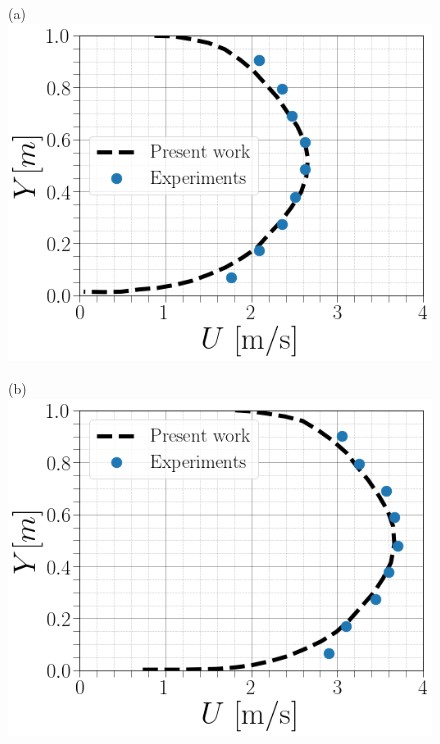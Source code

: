 \documentclass[review,3p,times,12pt]{elsarticle}
\begin{document}
\begin{minipage}[t]{0.5\textwidth}
\begin{figure}[H]
\begin{center}
(a)\includegraphics[scale = 0.3]{figs/V22}
\end{center}
\end{figure}
\end{minipage} \hfill 
\begin{minipage}[t]{0.5\textwidth}
\begin{figure}[H]
\begin{center}
(b)\includegraphics[scale = 0.3]{figs/3CFD}
\end{center}
\end{figure}
\end{minipage}\\
\end{document}
